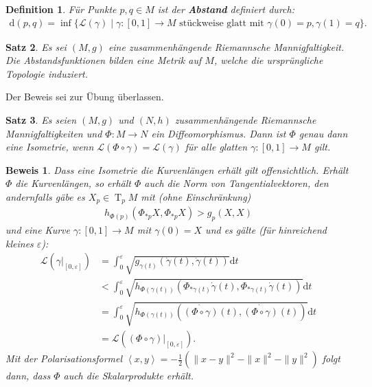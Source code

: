 \documentclass[paper=A4, twoside, chapterprefix=true, bibliography=totoc, headsepline]{scrbook}
\let\temp\phi{}
\let\phi\varphi{}
\let\varphi\temp{}
\let\temp\theta{}
\let\theta\vartheta{}
\let\vartheta\temp{}
\let\temp\epsilon{}
\let\epsilon\varepsilon{}
\let\varepsilon\temp{}
\let\temp\rho{}
\let\rho\varrho{}
\let\varrho\temp{}
\DeclareMathOperator{\T}{T}         %
\newcommand{\dop}{\mathrm{d}}
\theoremstyle{plain}
\newtheorem{Dfn}{Definition}[chapter]
\newtheorem{Satz}[Dfn]{Satz}
\theoremstyle{nonumberplain}
\newtheorem{bew}{Beweis}
\theoremstyle{empty}
\theoremstyle{break}
\newcommand{\CmIndex}[2][]{\ifthenelse{\isempty{#1}}{\index{#2}}{\index{#1}}#2}
\newcommand{\CmMark}[2][]{\textbf{\CmIndex[#1]{#2}}}
\begin{document}
\begin{Dfn}
  F\"ur Punkte $p, q \in M$ ist der \CmMark{Abstand} definiert durch:
  \begin{align*}
    \dop(p,q) = \inf\{ \mathcal L(\gamma) \mid \gamma \colon [0,1] \to M \text{ st\"uckweise glatt mit } \gamma(0) = p, \gamma(1) = q\}.
  \end{align*}
\end{Dfn}

\begin{Satz}
  Es sei $(M,g)$ eine zusammenh\"angende Riemannsche Mannigfaltigkeit.
  Die Abstandsfunktionen bilden eine Metrik auf $M$, welche die urspr\"ungliche Topologie induziert.
\end{Satz}

Der Beweis sei zur \"Ubung \"uberlassen.

\begin{Satz}
  Es seien $(M,g)$ und $(N,h)$ zusammenh\"angende Riemannsche Mannigfaltigkeiten und $\Phi \colon M \to N$ ein Diffeomorphismus.
  Dann ist $\Phi$ genau dann eine Isometrie, wenn $\mathcal L(\Phi \circ \gamma) = \mathcal L(\gamma)$ f\"ur alle glatten $\gamma \colon [0,1] \to M$ gilt. 
\end{Satz}

\begin{bew}
  Dass eine Isometrie die Kurvenl\"angen erh\"alt gilt offensichtlich. Erh\"alt $\Phi$ die Kurvenl\"angen, so erh\"alt $\Phi$ auch die Norm von Tangentialvektoren, den andernfalls g\"abe es $X_p \in \T_pM$ mit (ohne Einschr\"ankung)
  \begin{align*}
    h_{\Phi(p)}(\Phi_{*p}X,\Phi_{*p}X) > g_p(X,X)
  \end{align*}
  und eine Kurve $\gamma\colon [0,1] \to M$ mit $\gamma(0) = X$ und es g\"alte (f\"ur hinreichend kleines $\epsilon$):
  \begin{align*}
    \mathcal L(\gamma|_{[0,\epsilon]}) & = \int_0^{\epsilon}\sqrt{g_{\gamma(t)}\left(\dot\gamma(t),\dot\gamma(t)\right)}\dop t\\
    & < \int_0^{\epsilon}\sqrt{h_{\Phi(\gamma(t))} \left(\Phi_{*\gamma(t)}\dot\gamma(t), \Phi_{*\gamma(t)}\dot\gamma(t)\right)}\dop t\\
    & = \int_0^{\epsilon}\sqrt{h_{\Phi(\gamma(t))} \left(\dot{(\Phi \circ \gamma)}(t), \dot{(\Phi \circ \gamma)}(t) \right)}\dop t\\
    & = \mathcal L \left((\Phi \circ \gamma)|_{[0,\epsilon]}\right).
  \end{align*}
  Mit der Polarisationsformel $\left<x,y\right> = - \frac{1}2 (\|x-y\|^{2} - \|x\|^2-\|y\|^2)$ folgt dann, dass $\Phi$ auch die Skalarprodukte erh\"alt.
\end{bew}
\end{document}
